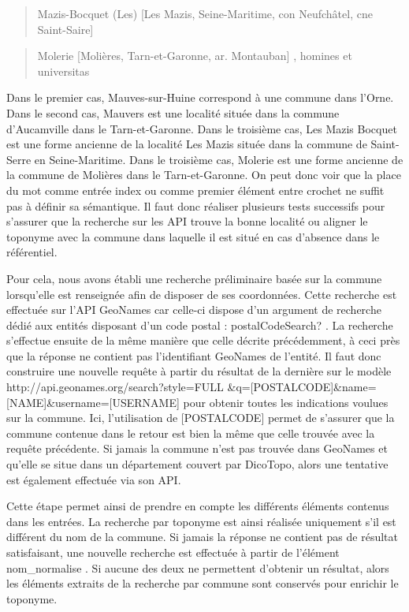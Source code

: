 \documentclass[a4paper,12pt,twoside]{book}
\begin{document}
	\begin{quotation}
		Mazis-Bocquet (Les) [Les Mazis, Seine-Maritime, con Neufchâtel, cne Saint-Saire]
	\end{quotation}

	\begin{quotation}
		Molerie [Molières, Tarn-et-Garonne, ar. Montauban] , homines et universitas
	\end{quotation}
	
	
	\noindent Dans le premier cas, Mauves-sur-Huine correspond à une commune dans l'Orne. Dans le second cas, Mauvers est une localité située dans la commune d'Aucamville dans le Tarn-et-Garonne. Dans le troisième cas, Les Mazis Bocquet est une forme ancienne de la localité Les Mazis située dans la commune de Saint-Serre en Seine-Maritime. Dans le troisième cas, Molerie est une forme ancienne de la commune de Molières dans le Tarn-et-Garonne. On peut donc voir que la place du mot comme entrée index ou comme premier élément entre crochet ne suffit pas à définir sa sémantique. Il faut donc réaliser plusieurs tests successifs pour s'assurer que la recherche sur les API trouve la bonne localité ou aligner le toponyme avec la commune dans laquelle il est situé en cas d'absence dans le référentiel.
	
	Pour cela, nous avons établi une recherche préliminaire basée sur la commune lorsqu'elle est renseignée afin de disposer de ses coordonnées. Cette recherche est effectuée sur l'API GeoNames car celle-ci dispose d'un argument de recherche dédié aux entités disposant d'un code postal : \og postalCodeSearch? \fg{}. La recherche s'effectue ensuite de la même manière que celle décrite précédemment, à ceci près que la réponse ne contient pas l'identifiant GeoNames de l'entité. Il faut donc construire une nouvelle requête à partir du résultat de la dernière sur le modèle \og http://api.geonames.org/search?style=FULL \&q=[POSTALCODE]\&name=[NAME]\&username=[USERNAME]\fg{} pour obtenir toutes les indications voulues sur la commune. Ici, l'utilisation de [POSTALCODE] permet de s'assurer que la commune contenue dans le retour est bien la même que celle trouvée avec la requête précédente. Si jamais la commune n'est pas trouvée dans GeoNames et qu'elle se situe dans un département couvert par DicoTopo, alors une tentative est également effectuée via son API.
	
	Cette étape permet ainsi de prendre en compte les différents éléments contenus dans les entrées. La recherche par toponyme est ainsi réalisée uniquement s'il est différent du nom de la commune. Si jamais la réponse ne contient pas de résultat satisfaisant, une nouvelle recherche est effectuée à partir de l'élément \og nom\_normalise \fg{}. Si aucune des deux ne permettent d'obtenir un résultat, alors les éléments extraits de la recherche par commune sont conservés pour enrichir le toponyme.
	
\end{document}
